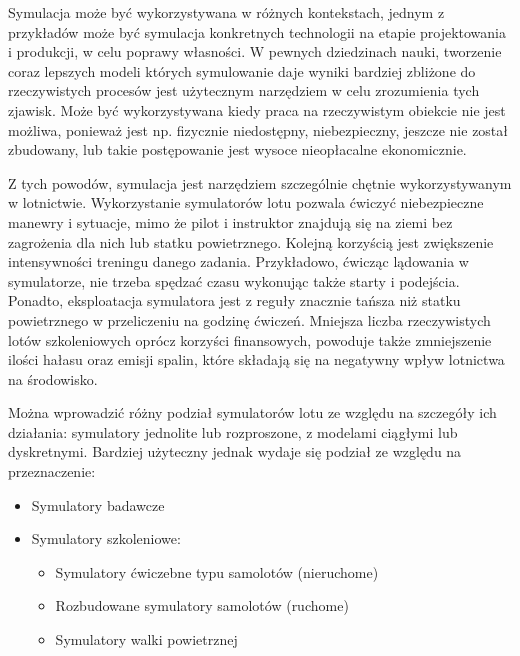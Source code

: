 Symulacja może być wykorzystywana w różnych kontekstach, jednym z przykładów może być symulacja konkretnych technologii na etapie projektowania i produkcji, w celu poprawy własności. W pewnych dziedzinach nauki, tworzenie coraz lepszych modeli których symulowanie daje wyniki bardziej zbliżone do rzeczywistych procesów jest użytecznym narzędziem w celu zrozumienia tych zjawisk. Może być wykorzystywana kiedy praca na rzeczywistym obiekcie nie jest możliwa, ponieważ jest np. fizycznie niedostępny, niebezpieczny, jeszcze nie został zbudowany, lub takie postępowanie jest wysoce nieopłacalne ekonomicznie.

Z tych powodów, symulacja jest narzędziem szczególnie chętnie wykorzystywanym w lotnictwie\cite{neal2020}. Wykorzystanie symulatorów lotu pozwala ćwiczyć niebezpieczne manewry i sytuacje, mimo że pilot i instruktor znajdują się na ziemi bez zagrożenia dla nich lub statku powietrznego. Kolejną korzyścią jest zwiększenie intensywności treningu danego zadania. Przykładowo, ćwicząc lądowania w symulatorze, nie trzeba spędzać czasu wykonując także starty i podejścia. Ponadto, eksploatacja symulatora jest z reguły znacznie tańsza niż statku powietrznego w przeliczeniu na godzinę ćwiczeń. Mniejsza liczba rzeczywistych lotów szkoleniowych oprócz korzyści finansowych, powoduje także zmniejszenie ilości hałasu oraz emisji spalin, które składają się na negatywny wpływ lotnictwa na środowisko\cite{eaer2019}.

Można wprowadzić różny podział symulatorów lotu ze względu na szczegóły ich działania: symulatory jednolite lub rozproszone, z modelami ciągłymi lub dyskretnymi. Bardziej użyteczny jednak wydaje się podział ze względu na przeznaczenie\cite{szczepanski1990}:
\begin{itemize}
  \item Symulatory badawcze
  \item Symulatory szkoleniowe:
  \begin{itemize}
    \item Symulatory ćwiczebne typu samolotów (nieruchome)
    \item Rozbudowane symulatory samolotów (ruchome)
    \item Symulatory walki powietrznej
  \end{itemize}
\end{itemize}

